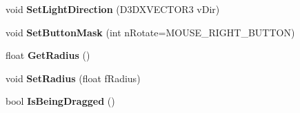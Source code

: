 \begin{DoxyCompactItemize}
\item 
\hypertarget{class_c_d_x_u_t_direction_widget_a05adf625e2a190ed1e238ddf1879e924}{void {\bfseries Set\+Light\+Direction} (D3\+D\+X\+V\+E\+C\+T\+O\+R3 v\+Dir)}\label{class_c_d_x_u_t_direction_widget_a05adf625e2a190ed1e238ddf1879e924}

\item 
\hypertarget{class_c_d_x_u_t_direction_widget_a00effccf13b6c745ab7e3d327a147074}{void {\bfseries Set\+Button\+Mask} (int n\+Rotate=M\+O\+U\+S\+E\+\_\+\+R\+I\+G\+H\+T\+\_\+\+B\+U\+T\+T\+O\+N)}\label{class_c_d_x_u_t_direction_widget_a00effccf13b6c745ab7e3d327a147074}

\item 
\hypertarget{class_c_d_x_u_t_direction_widget_a6d6a395df8932ae372b2f7eea3b17f00}{float {\bfseries Get\+Radius} ()}\label{class_c_d_x_u_t_direction_widget_a6d6a395df8932ae372b2f7eea3b17f00}

\item 
\hypertarget{class_c_d_x_u_t_direction_widget_addcf13e0f53367fc773228c987bae9b9}{void {\bfseries Set\+Radius} (float f\+Radius)}\label{class_c_d_x_u_t_direction_widget_addcf13e0f53367fc773228c987bae9b9}

\item 
\hypertarget{class_c_d_x_u_t_direction_widget_a9705e4cdb115b728a6a87d3d535ec64c}{bool {\bfseries Is\+Being\+Dragged} ()}\label{class_c_d_x_u_t_direction_widget_a9705e4cdb115b728a6a87d3d535ec64c}

\end{DoxyCompactItemize}
